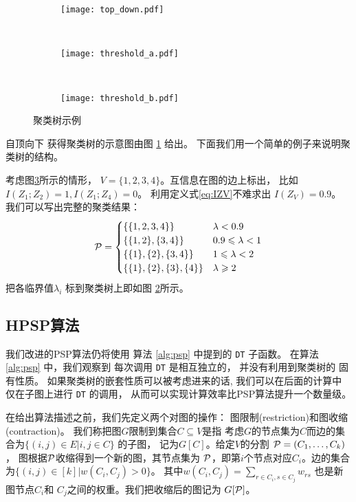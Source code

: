   \begin{figure}[!ht]
    \centering
    \begin{subfigure}[b]{0.38\linewidth}
      \centering
      \texttt{[image: top\_down.pdf]}
      \caption{}\label{fig:top_down}
    \end{subfigure}~
  \begin{subfigure}[b]{0.33\linewidth}
    \centering
    \texttt{[image: threshold\_a.pdf]}
    \caption{}\label{fig:threshold_a}
  \end{subfigure}~
  \begin{subfigure}[b]{0.29\linewidth}
    \centering
    \texttt{[image: threshold\_b.pdf]}
    \caption{}\label{fig:threshold_b}
  \end{subfigure}
    \caption{聚类树示例}\label{fig:mmi_example}
  \end{figure}
自顶向下
获得聚类树的示意图由图 \ref{fig:top_down} 给出。
下面我们用一个简单的例子来说明聚类树的结构。
  \begin{example}\label{ex:mmi_tree}
考虑图\ref{fig:threshold_b}所示的情形，
$V=\{1,2,3,4\}$。互信息在图的边上标出，
比如 $I(Z_1;Z_2)=1, I(Z_1;Z_4)=0$。
利用定义式\ref{eq:IZV}不难求出
$I(Z_V)=0.9$。 
我们可以写出完整的聚类结果：
\begin{equation*}
\P = 
\begin{cases}
\{\{1,2,3,4\}\} & \lambda < 0.9 \\
\{\{1,2\},\{3,4\}\} & 0.9 \leq \lambda < 1 \\
\{\{1\},\{2\},\{3,4\}\} & 1 \leq \lambda < 2\\
\{\{1\},\{2\},\{3\},\{4\}\} & \lambda \geq 2
\end{cases}
\end{equation*}
把各临界值$\lambda_i$ 标到聚类树上即如图
\ref{fig:threshold_a}所示。
\end{example}
\subsection{HPSP算法}
我们改进的PSP算法仍将使用
算法 \ref{alg:psp} 中提到的
\texttt{DT} 子函数。
在算法\ref{alg:psp} 中，我们观察到
每次调用 \texttt{DT} 是相互独立的，
并没有利用到聚类树的 固有性质。
如果聚类树的嵌套性质可以被考虑进来的话, 
我们可以在后面的计算中
仅在子图上进行 \texttt{DT} 的调用，
从而可以实现计算效率比PSP算法提升一个数量级。

在给出算法描述之前，我们先定义两个对图的操作：
图限制(restriction)和图收缩(contraction)。
我们称把图$G$限制到集合$C\subseteq V$是指
考虑$G$的节点集为$C$而边的集合为$\{(i,j) \in E | i,j \in C \}$
的子图，
记为$G[C]$。给定$V$的分割 $\P=(C_1, \dots, C_k)$，
图根据$\P$收缩得到一个新的图，其节点集为
$\P$，即第$i$个节点对应$C_i$。边的集合为$\{(i,j) \in [k] | w(C_i, C_j) > 0 \}$。
其中$w(C_i, C_j)=\sum_{r \in C_i, s \in C_j} w_{rs} $
也是新图节点$C_i$和 $C_j$之间的权重。我们把收缩后的图记为
$G[\P]$。


